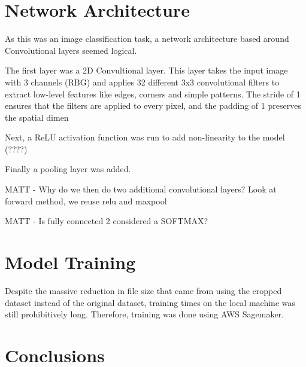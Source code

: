 \documentclass{article}
\begin{document}
\section{Network Architecture}

As this was an image classification task, a network architecture based around Convolutional layers seemed logical.

The first layer was a 2D Convultional layer. This layer takes the input image with 3 channels (RBG) and applies 32 different 3x3 convolutional filters to
extract low-level features like edges, corners and simple patterns. The stride of 1 ensures that the filters are applied to every pixel, and the 
padding of 1 preserves the spatial dimen 

Next, a ReLU activation function was run to add non-linearity to the model (????)

Finally a pooling layer was added.

MATT - Why do we then do two additional convolutional layers?
Look at forward method, we reuse relu and maxpool

MATT - Is fully connected 2 considered a SOFTMAX? 

\section{Model Training}

Despite the massive reduction in file size that came from using the cropped dataset instead of the original dataset, training times on the local machine was still prohibitively long. Therefore, training was done using AWS Sagemaker.


\section{Conclusions}





\end{document}
